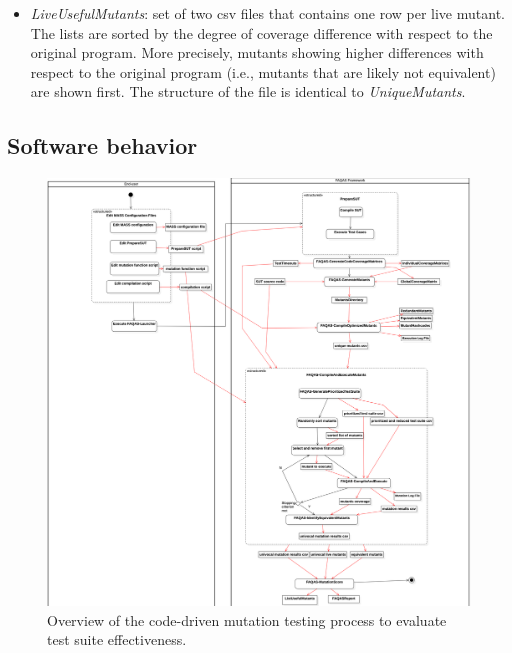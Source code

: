 \begin{itemize}
{\begin{itemize}
		\item \textit{LiveUsefulMutants}: set of two csv files that contains one row per live mutant. The lists are sorted by the degree of coverage difference with respect to the original program. More precisely, mutants showing higher differences with respect to the original program (i.e., mutants that are likely not equivalent) are shown first. The structure of the file is identical to \textit{UniqueMutants}.
	\end{itemize}
	}
\end{itemize}

\clearpage


\subsection{Software behavior}
\label{sec:behavior_mass}



\begin{figure}[h]
  \centering
	\includegraphics[width=\textwidth]{images/CodeDrivenTestSuiteEvaluation.png}
      \caption{Overview of the code-driven mutation testing process to evaluate test suite effectiveness.}
      \label{fig:process:codeDriven:evaluation}
\end{figure}


